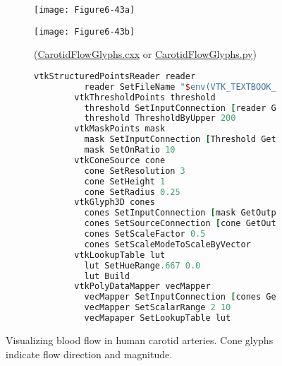 \begin{figure}[!htb]
	\begin{subfigure}[h]{0.48\linewidth}
		\texttt{[image: Figure6-43a]}
		\caption*{}
		\label{fig:Figure6-43a}
	\end{subfigure}
	\hfill
	\begin{subfigure}[h]{0.48\linewidth}
		\texttt{[image: Figure6-43b]}
		\caption*{(\href{https://lorensen.github.io/VTKExamples/site/Cxx/VisualizationAlgorithms/CarotidFlowGlyphs/}{CarotidFlowGlyphs.cxx} or \href{https://lorensen.github.io/VTKExamples/site/Python/VisualizationAlgorithms/CarotidFlowGlyphs/}{CarotidFlowGlyphs.py})}
		\label{fig:Figure6-43b}
	\end{subfigure}
	\hfill
	\begin{subfigure}[h]{0.96\linewidth}
		\caption*{}
	\end{subfigure}
	\hfill
	\begin{subfigure}[h]{0.96\linewidth}
		\begin{lstlisting}[language=TCL, caption={}]
		vtkStructuredPointsReader reader
		  reader SetFileName "$env(VTK_TEXTBOOK_DATA)/carotid.vtk"
		vtkThresholdPoints threshold
		  threshold SetInputConnection [reader GetOutputPort]
		  threshold ThresholdByUpper 200
		vtkMaskPoints mask
		  mask SetInputConnection [Threshold GetOutputPort]
		  mask SetOnRatio 10
		vtkConeSource cone
		  cone SetResolution 3
		  cone SetHeight 1
		  cone SetRadius 0.25
		vtkGlyph3D cones
		  cones SetInputConnection [mask GetOutputPort]
		  cones SetSourceConnection [cone GetOutputPort]
		  cones SetScaleFactor 0.5
		  cones SetScaleModeToScaleByVector
		vtkLookupTable lut
		  lut SetHueRange.667 0.0
		  lut Build
		vtkPolyDataMapper vecMapper
		  vecMapper SetInputConnection [cones GetOutputPort]
		  vecMapper SetScalarRange 2 10
		  vecMapaper SetLookupTable lut
		\end{lstlisting}
		\caption*{}
		\label{fig:Figure6-43c}
	\end{subfigure}
	\caption{Visualizing blood flow in human carotid arteries. Cone glyphs indicate flow direction and magnitude.}\label{fig:Figure6-43}
\end{figure}

